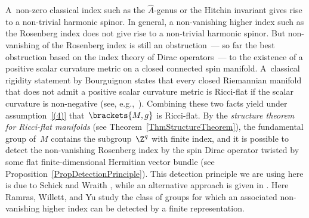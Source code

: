 \documentclass[10pt,a4paper]{amsart}
\numberwithin{equation}{section}
\begin{document}
A~non-zero classical index such as the $\hat{A}$-genus or the Hitchin invariant gives rise to a non-trivial harmonic spinor. In general, a non-vanishing higher index such as the Rosenberg index does not give rise to a non-trivial harmonic spinor. But non-vanishing of the Rosenberg index is still an obstruction~--- so far the best obstruction based on the index theory of Dirac operators~--- to the existence of a positive scalar curvature metric on a closed connected spin manifold. A~classical rigidity statement by Bourguignon states that every closed Riemannian manifold that does not admit a positive scalar curvature metric is Ricci-flat if the scalar curvature is non-negative (see, e.g.,~\cite{Kazdan1975a}). Combining these two facts yield under assumption~\ref{(4)} that~$\brackets{M,g}$ is Ricci-flat. By the \textit{structure theorem for Ricci-flat manifolds} (see Theorem~\ref{ThmStructureTheorem}), the fundamental group of~$M$ contains the subgroup~$\Z^q$ with finite index, and it is possible to detect the non-vanishing Rosenberg index by the spin Dirac operator twisted by some flat finite-dimensional Hermitian vector bundle (see Proposition~\ref{PropDetectionPrinciple}). This detection principle we are using here is due to Schick and Wraith \cite{Schick2021a}, while an alternative approach is given in \cite[Section 3]{Ramras2013}. Here Ramras, Willett, and Yu \cite{Ramras2013} study the class of groups for which an associated non-vanishing higher index can be detected by a finite representation.
\end{document}
